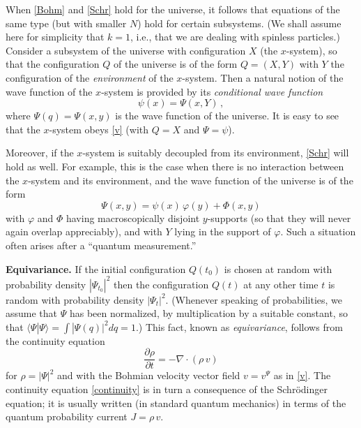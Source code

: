 \documentclass[12pt]{report}
\newcommand{\scp}[2]{\langle #1|#2 \rangle}
\newcommand{\be}{\begin{equation}}
\newcommand{\ee}{\end{equation}}
\begin{document}
When \eqref{Bohm} and \eqref{Schr} hold for the universe, it follows that equations of the same type (but with smaller $N$) hold for certain subsystems. 
%
(We shall assume here for simplicity that $k=1$, i.e., that we are dealing with spinless particles.) Consider a subsystem of the universe with configuration $X$ (the $x$-system), so that the configuration $Q$ of the universe is of the form $Q=(X,Y)$ with $Y$ the configuration of the \emph{environment} of the $x$-system. Then a natural notion of the wave function of the $x$-system is provided by its \emph{conditional wave function}
\be\label{condwf}
\psi(x) = \Psi(x,Y)\,,
\ee
where $\Psi(q) = \Psi(x,y)$ is the wave function of the universe. It is easy to see that the $x$-system obeys \eqref{v} (with $Q=X$ and $\Psi=\psi$).

Moreover, if the $x$-system is suitably decoupled from its environment, \eqref{Schr} will hold as well. 
%
For example, this is the case when there is no interaction between the
$x$-system and its environment, and the wave function of the universe is of
the form
\begin{equation}\label{effectivewf}
\Psi(x,y) = \psi(x)\, \varphi(y) + \Phi(x,y)
\end{equation}
with $\varphi$ and $\Phi$ having macroscopically disjoint $y$-supports (so
that they will never again overlap appreciably), and with $Y$ lying in the
support of $\varphi$. Such a situation often arises after a ``quantum
measurement.''

\bigskip

\noindent\textbf{Equivariance.}
If the initial configuration $Q(t_0)$ is chosen at random with probability density $|\Psi_{t_0}|^2$ then the configuration $Q(t)$ at any other time $t$ is random with probability density $|\Psi_t|^2$. (Whenever speaking of probabilities, we assume that $\Psi$ has been normalized, by multiplication by a suitable constant, so that $\scp{\Psi}{\Psi}=\int |\Psi(q)|^2 dq=1$.) This fact, known as \emph{equivariance}, follows from the continuity equation
\begin{equation}\label{continuity}
\frac{\partial\rho}{\partial t} = - \nabla \cdot (\rho \, v)
\end{equation}
for $\rho = |\Psi|^2$ and with the Bohmian velocity vector field $v=v^\Psi$ as in \eqref{v}. The continuity equation \eqref{continuity} is in turn a consequence of the Schr\"odinger equation; it is usually written (in standard quantum mechanics) in terms of the quantum probability current $J=\rho \, v$.
\end{document}
